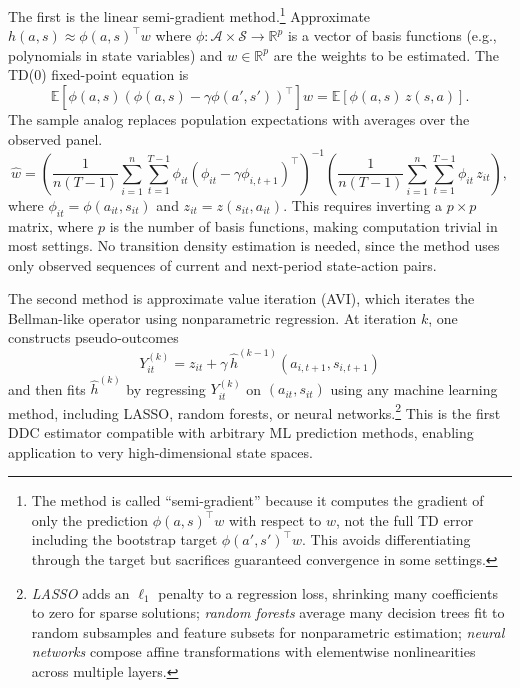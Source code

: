 The first is the linear semi-gradient method.\footnote{The method is called ``semi-gradient'' because it computes the gradient of only the prediction $\phi(a,s)^\top w$ with respect to $w$, not the full TD error including the bootstrap target $\phi(a',s')^\top w$. This avoids differentiating through the target but sacrifices guaranteed convergence in some settings.} Approximate $h(a,s) \approx \phi(a,s)^\top w$ where $\phi: \mathcal{A} \times \mathcal{S} \to \mathbb{R}^p$ is a vector of basis functions (e.g., polynomials in state variables) and $w \in \mathbb{R}^p$ are the weights to be estimated. The TD(0) fixed-point equation is
\begin{equation}
\mathbb{E}\left[\phi(a,s)\left(\phi(a,s) - \gamma \phi(a', s')\right)^\top\right] w = \mathbb{E}\left[\phi(a,s) \, z(s,a)\right]. \label{eq:ae_semigradient}
\end{equation}
The sample analog replaces population expectations with averages over the observed panel.
\begin{equation}
\hat{w} = \left(\frac{1}{n(T-1)} \sum_{i=1}^n \sum_{t=1}^{T-1} \phi_{it}\left(\phi_{it} - \gamma \phi_{i,t+1}\right)^\top\right)^{-1} \left(\frac{1}{n(T-1)} \sum_{i=1}^n \sum_{t=1}^{T-1} \phi_{it} \, z_{it}\right),
\end{equation}
where $\phi_{it} = \phi(a_{it}, s_{it})$ and $z_{it} = z(s_{it}, a_{it})$. This requires inverting a $p \times p$ matrix, where $p$ is the number of basis functions, making computation trivial in most settings. No transition density estimation is needed, since the method uses only observed sequences of current and next-period state-action pairs.

The second method is approximate value iteration (AVI), which iterates the Bellman-like operator using nonparametric regression. At iteration $k$, one constructs pseudo-outcomes
\begin{equation}
Y_{it}^{(k)} = z_{it} + \gamma \, \hat{h}^{(k-1)}(a_{i,t+1}, s_{i,t+1})
\end{equation}
and then fits $\hat{h}^{(k)}$ by regressing $Y_{it}^{(k)}$ on $(a_{it}, s_{it})$ using any machine learning method, including LASSO, random forests, or neural networks.\footnote{\emph{LASSO} \citep{Tibshirani1996} adds an $\ell_1$ penalty to a regression loss, shrinking many coefficients to zero for sparse solutions; \emph{random forests} average many decision trees fit to random subsamples and feature subsets for nonparametric estimation; \emph{neural networks} compose affine transformations with elementwise nonlinearities across multiple layers.} This is the first DDC estimator compatible with arbitrary ML prediction methods, enabling application to very high-dimensional state spaces.

